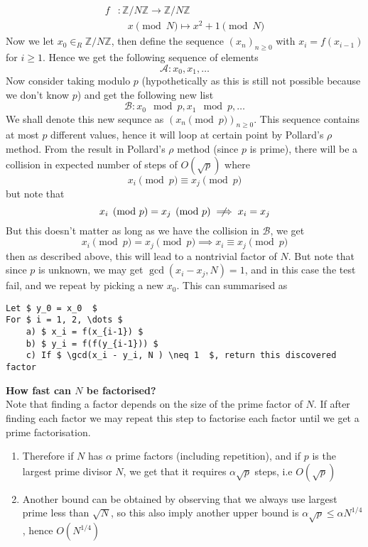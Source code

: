 \documentclass[a4 paper]{article}
\newcommand{\?}{\stackrel{?}{=}}
\begin{document}
\begin{align*}
    f & : \mathbb{Z} / N \mathbb{Z} \to \mathbb{Z} / N \mathbb{Z} \\ 
    & \quad x\pmod N\mapsto x^2 + 1 \pmod N
\end{align*}
Now we let $ x_0 \in_R \mathbb{Z}/ N \mathbb{Z} $, then define the sequence $ (x_n)_{n \geq 0} $ with $ x_{i}  = f(x_{i-1}) $ for $ i\geq 1 $. Hence we get the following sequence of elements 
$$ \mathcal{A} : x_0 , x_1 , \dots  $$
Now consider taking modulo $ p $ (hypothetically as this is still not possible because we don't know $ p $) and get the following new list
$$ \mathcal{B} : x_0 \mod p , x_1 \mod p , \dots  $$
We shall denote this new sequnce as $ (x_n \pmod p)_{n \geq 0} $. This sequence contains at most $ p $ different values, hence it will loop at certain point by Pollard's $ \rho $ method. From the result in Pollard's $ \rho $  method (since $ p $ is prime), there will be a collision in expected number of steps of $ O(\sqrt{p}) $ where
$$ x_i \pmod p \equiv x_j \pmod p  $$
but note that 
$$ x_i \pmod p = x_j \pmod p \centernot \implies x_i = x_j $$
But this doesn't matter as long as we have the collision in $ \mathcal{B} $, we get 
$$ x_i \pmod p = x_j \pmod {p} \implies x_i \equiv x_j \pmod p $$
then as described above, this will lead to a nontrivial factor of $ N $. But note that since $ p $ is unknown, we may get $ \gcd(x_i  -x_j , N ) = 1  $, and in this case the test fail, and we repeat by picking a new $ x_0  $. This can summarised as 

\lstset{style=MathsAlgostyle}
\begin{lstlisting}
Let $ y_0 = x_0  $ 
For $ i = 1, 2, \dots $
    a) $ x_i = f(x_{i-1}) $ 
    b) $ y_i = f(f(y_{i-1})) $ 
    c) If $ \gcd(x_i - y_i, N ) \neq 1  $, return this discovered factor
\end{lstlisting}

\begin{note}{\bcicosaedre}
\textbf{How fast can $ N $ be factorised?}  \\
Note that finding a factor depends on the size of the prime factor of $ N $. If after finding each factor we may repeat this step to factorise each factor until we get a prime factorisation. 
\begin{enumerate}
    \item Therefore if $ N $ has $ \alpha $ prime factors (including repetition), and if $ p $ is the largest prime divisor $ N $, we get that it requires $ \alpha \sqrt{p} $ steps, i.e $ \boxed{O(\sqrt{p})} $ 
    \item Another bound can be obtained by observing that we always use largest prime less than $ \sqrt{N} $, so this also imply another upper bound is $ \alpha \sqrt{p} \leq \alpha N^{1 / 4} $, hence $ \boxed{O(N^{1 /4})} $
\end{enumerate}


\end{note}
\end{document}
